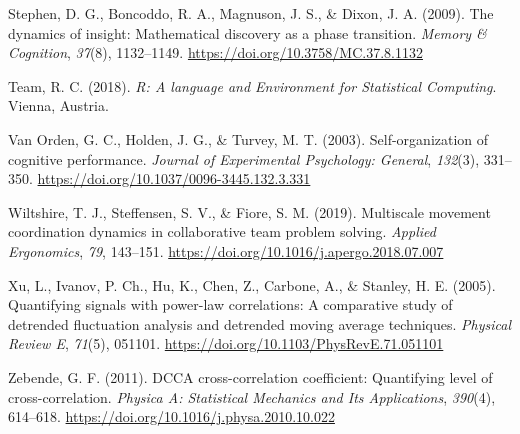 \documentclass[
  man]{apa6}
\newlength{\cslhangindent}
\newlength{\cslentryspacingunit} %
\newenvironment{CSLReferences}[2] %
 {%
  \setlength{\parindent}{0pt}
  \ifodd #1
  \let\oldpar\par
  \def\par{\hangindent=\cslhangindent\oldpar}
  \fi
  \setlength{\parskip}{#2\cslentryspacingunit}
 }%
 {}
\begin{document}
\begin{CSLReferences}{1}{0}
\leavevmode{}%
Stephen, D. G., Boncoddo, R. A., Magnuson, J. S., \& Dixon, J. A. (2009). The dynamics of insight: {Mathematical} discovery as a phase transition. \emph{Memory \& Cognition}, \emph{37}(8), 1132--1149. \url{https://doi.org/10.3758/MC.37.8.1132}

\leavevmode{}%
Team, R. C. (2018). \emph{R: {A} language and {Environment} for {Statistical} {Computing}}. Vienna, Austria.

\leavevmode{}%
Van Orden, G. C., Holden, J. G., \& Turvey, M. T. (2003). Self-organization of cognitive performance. \emph{Journal of Experimental Psychology: General}, \emph{132}(3), 331--350. \url{https://doi.org/10.1037/0096-3445.132.3.331}

\leavevmode{}%
Wiltshire, T. J., Steffensen, S. V., \& Fiore, S. M. (2019). Multiscale movement coordination dynamics in collaborative team problem solving. \emph{Applied Ergonomics}, \emph{79}, 143--151. \url{https://doi.org/10.1016/j.apergo.2018.07.007}

\leavevmode{}%
Xu, L., Ivanov, P. Ch., Hu, K., Chen, Z., Carbone, A., \& Stanley, H. E. (2005). Quantifying signals with power-law correlations: A comparative study of detrended fluctuation analysis and detrended moving average techniques. \emph{Physical Review E}, \emph{71}(5), 051101. \url{https://doi.org/10.1103/PhysRevE.71.051101}

\leavevmode{}%
Zebende, G. F. (2011). {DCCA} cross-correlation coefficient: {Quantifying} level of cross-correlation. \emph{Physica A: Statistical Mechanics and Its Applications}, \emph{390}(4), 614--618. \url{https://doi.org/10.1016/j.physa.2010.10.022}

\end{CSLReferences}

\endgroup
\end{document}
